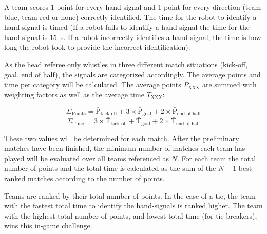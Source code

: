 A team scores 1 point for every hand-signal and 1 point for every direction (team blue, team red or none) correctly identified.
The time for the robot to identify a hand-signal is timed (If a robot fails to identify a hand-signal the time for the hand-signal is \qty{15}{\second}. If a robot incorrectly identifies a hand-signal, the time is how long the robot took to provide the incorrect identification).

As the head referee only whistles in three different match situations (kick-off, goal, end of half), the signals are categorized accordingly. The average points and time per category will be calculated. The average points $\bar{P}_{\mathrm{XXX}}$ are summed with weighting factors as well as the average time $\bar{T}_{\mathrm{XXX}}$:

\begin{equation*}
    \Sigma_\mathrm{Points} = \bar{\mathrm{P}}_{\mathrm{kick\_off}} + 3 \times \bar{\mathrm{P}}_{\mathrm{goal}} + 2 \times \bar{\mathrm{P}}_{\mathrm{end\_of\_half}}
\end{equation*}
\begin{equation*}
    \Sigma_\mathrm{Time} = 3 \times \bar{\mathrm{T}}_{\mathrm{kick\_off}} + \bar{\mathrm{T}}_{\mathrm{goal}} + 2 \times \bar{\mathrm{T}}_{\mathrm{end\_of\_half}}
\end{equation*}

These two values will be determined for each match. After the preliminary matches have been finished, the minimum number of matches each team has played will be evaluated over all teams referenced as $N$. For each team the total number of points and the total time is calculated as the sum of the $N - 1$ best ranked matches according to the number of points.

Teams are ranked by their total number of points. In the case of a tie, the team with the fastest total time to identify the hand-signals is ranked higher. The team with the highest total number of points, and lowest total time (for tie-breakers), wins this in-game challenge.
